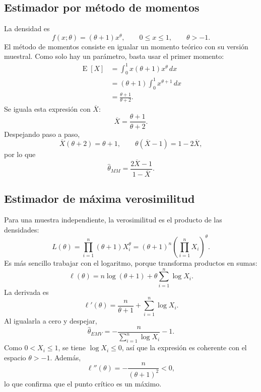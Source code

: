 \documentclass[10pt,a4paper,oneside]{article}
\newcommand{\E}{\operatorname{E}}
\begin{document}
\subsection*{Estimador por método de momentos}

La densidad es
\begin{equation*}
f(x;\theta)=(\theta+1)x^\theta,
\qquad0\leq x\leq1,
\qquad\theta>-1.
\end{equation*}
El método de momentos consiste en igualar un momento teórico con su versión muestral. Como solo hay un parámetro, basta usar el primer momento:
\begin{align*}
\E[X]
&=\int_0^1x(\theta+1)x^\theta\,dx\\
&=(\theta+1)\int_0^1x^{\theta+1}\,dx\\
&=\frac{\theta+1}{\theta+2}.
\end{align*}
Se iguala esta expresión con $\overline X$:
\begin{equation*}
\overline X=\frac{\theta+1}{\theta+2}.
\end{equation*}
Despejando paso a paso,
\begin{equation*}
\overline X(\theta+2)=\theta+1,
\qquad
\theta(\overline X-1)=1-2\overline X,
\end{equation*}
por lo que
\begin{equation}
\boxed{
\widehat\theta_{MM}=\frac{2\overline X-1}{1-\overline X}.}
\label{eq:mm}
\end{equation}

\subsection*{Estimador de máxima verosimilitud}

Para una muestra independiente, la verosimilitud es el producto de las densidades:
\begin{equation*}
L(\theta)
=\prod_{i=1}^{n}(\theta+1)X_i^\theta
=(\theta+1)^n\left(\prod_{i=1}^{n}X_i\right)^\theta.
\end{equation*}
Es más sencillo trabajar con el logaritmo, porque transforma productos en sumas:
\begin{equation*}
\ell(\theta)=n\log(\theta+1)+\theta\sum_{i=1}^{n}\log X_i.
\end{equation*}
La derivada es
\begin{equation*}
\ell'(\theta)=\frac{n}{\theta+1}+\sum_{i=1}^{n}\log X_i.
\end{equation*}
Al igualarla a cero y despejar,
\begin{equation}
\boxed{
\widehat\theta_{EMV}=-\frac{n}{\sum_{i=1}^{n}\log X_i}-1.}
\label{eq:emv}
\end{equation}
Como $0<X_i\leq1$, se tiene $\log X_i\leq0$, así que la expresión es coherente con el espacio $\theta>-1$. Además,
\begin{equation*}
\ell''(\theta)=-\frac{n}{(\theta+1)^2}<0,
\end{equation*}
lo que confirma que el punto crítico es un máximo.
\end{document}
